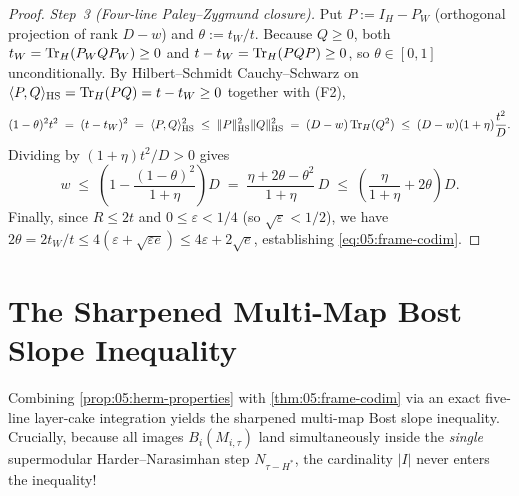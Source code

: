 \begin{proof}
\emph{Step~3 (Four-line Paley--Zygmund closure).} Put $P := I_H - P_W$ (orthogonal projection of rank $D - w$) and $\theta := t_W / t$. Because $Q \ge 0$, both $t_W = \operatorname{Tr}_H(P_W Q P_W) \ge 0$ and $t - t_W = \operatorname{Tr}_H(P Q P) \ge 0$, so $\theta \in [0, 1]$ unconditionally. By Hilbert--Schmidt Cauchy--Schwarz on $\langle P, Q \rangle_{\mathrm{HS}} = \operatorname{Tr}_H(P Q) = t - t_W \ge 0$ together with (F2),
\[
  (1 - \theta)^2 t^2 \;=\; (t - t_W)^2 \;=\; \langle P, Q \rangle_{\mathrm{HS}}^2
  \;\le\; \|P\|_{\mathrm{HS}}^2 \|Q\|_{\mathrm{HS}}^2 \;=\; (D - w)\operatorname{Tr}_H(Q^2)
  \;\le\; (D - w)(1 + \eta)\frac{t^2}{D}.
\]
Dividing by $(1 + \eta)t^2 / D > 0$ gives
\[
  w \;\le\; \left(1 - \frac{(1 - \theta)^2}{1 + \eta}\right) D
  \;=\; \frac{\eta + 2\theta - \theta^2}{1 + \eta}\, D
  \;\le\; \left(\frac{\eta}{1 + \eta} + 2\theta\right) D.
\]
Finally, since $R \le 2t$ and $0 \le \varepsilon < 1/4$ (so $\sqrt{\varepsilon} < 1/2$), we have $2\theta = 2 t_W / t \le 4(\varepsilon + \sqrt{\varepsilon e}) \le 4\varepsilon + 2\sqrt{e}$, establishing \eqref{eq:05:frame-codim}.
\end{proof}

\section{The Sharpened Multi-Map Bost Slope Inequality}
\label{sec:05:multi-bost}

Combining \cref{prop:05:herm-properties} with \cref{thm:05:frame-codim} via an exact five-line layer-cake integration yields the sharpened multi-map Bost slope inequality. Crucially, because all images $B_i(M_{i,\tau})$ land simultaneously inside the \emph{single} supermodular Harder--Narasimhan step $N_{\tau - H^*}$, the cardinality $|I|$ never enters the inequality!


